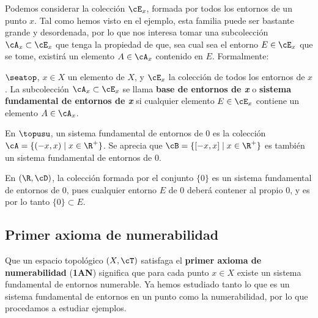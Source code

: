 Podemos considerar la colección $\cE_x$, formada por todos los entornos de un punto $x$. Tal como hemos visto en el ejemplo, esta familia puede ser bastante grande y desordenada, por lo que nos interesa tomar una subcolección $\cA_x \subset \cE_x$ que tenga la propiedad de que, sea cual sea el entorno $E\in \cE_x$ que se tome, existirá un elemento $A\in \cA_x$ contenido en $E$. Formalmente:

\begin{deff}
    $\seatop$, $x\in X$ un elemento de $X$, y $\cE_x$ la colección de todos los entornos de $x$. La subcolección $\cA_x \subset \cE_x$ se llama {\bf base de entornos de {\it \textbf{x}}} o {\bf sistema fundamental de entornos de {\it \textbf{x}}} si cualquier elemento $E\in\cE_x$ contiene un elemento $A\in\cA_x$.
\end{deff}

\begin{ejs}
    \item En $\topusu$, un sistema fundamental de entornos de $0$ es la colección $\cA = \{(-x,x) \mid x \in \R^+\}$. Se aprecia que $\cB = \{[-x,x] \mid x \in \R^+\}$ es también un sistema fundamental de entornos de $0$.
    \item En $(\R, \cD)$, la colección formada por el conjunto $\{0\}$ es un sistema fundamental de entornos de $0$, pues cualquier entorno $E$ de $0$ deberá contener al propio $0$, y es por lo tanto $\{0\}\subset E$.
\end{ejs}

\subsection*{Primer axioma de numerabilidad}

Que un espacio topológico $(X,\cT)$ satisfaga el {\bf primer axioma de numerabilidad} ({\bf 1AN}) significa que para cada punto $x\in X$ existe un sistema fundamental de entornos numerable. Ya hemos estudiado tanto lo que es un sistema fundamental de entornos en un punto como la numerabilidad, por lo que procedamos a estudiar ejemplos.

